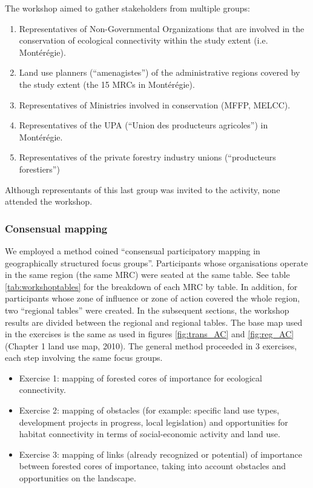The workshop aimed to gather stakeholders from multiple groups:
\begin{enumerate}
  \item Representatives of Non-Governmental Organizations that are involved in the conservation of ecological connectivity within the study extent (i.e. Montérégie).
  \item Land use planners (“amenagistes”) of the administrative regions covered by the study extent (the 15 MRCs in Montérégie).
  \item Representatives of Ministries involved in conservation (MFFP, MELCC).
  \item Representatives of the UPA (“Union des producteurs agricoles”) in Montérégie.
  \item Representatives of the private forestry industry unions (“producteurs forestiers”)
\end{enumerate}
Although representants of this last group was invited to the activity, none attended the workshop. \\

\subsubsection{Consensual mapping}

We employed a method coined “consensual participatory mapping in geographically structured focus groups”. Participants whose organisations operate in the same region (the same MRC) were seated at the same table. See table \ref{tab:workshoptables} for the breakdown of each MRC by table. In addition, for participants whose zone of influence or zone of action covered the whole region, two “regional tables” were created. In the subsequent sections, the workshop results are divided between the regional and regional tables. The base map used in the exercises is the same as used in figures \ref{fig:trans_AC} and \ref{fig:reg_AC} (Chapter 1 land use map, 2010). 
The general method proceeded in 3 exercises, each step involving the same focus groups.

\begin{itemize}
  \item Exercise 1: mapping of forested cores of importance for ecological connectivity.
  \item Exercise 2: mapping of obstacles (for example: specific land use types, development projects in progress, local legislation) and opportunities for habitat connectivity in terms of social-economic activity and land use.
  \item Exercise 3: mapping of links (already recognized or potential) of importance between forested cores of importance, taking into account obstacles and opportunities on the landscape.
\end{itemize}

